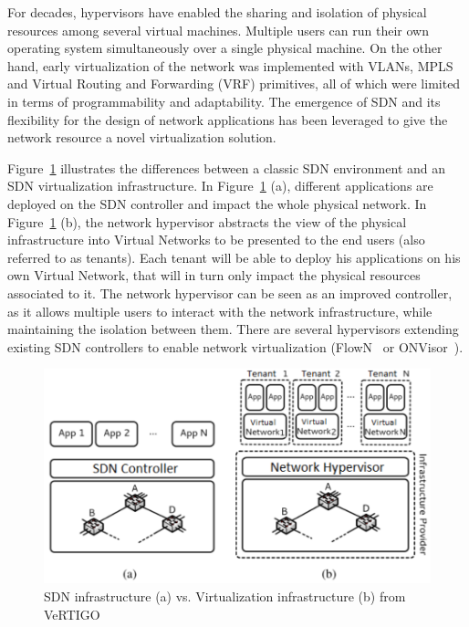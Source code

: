 For decades, hypervisors have enabled the sharing and isolation of physical resources among several virtual machines.
Multiple users can run their own operating system simultaneously over a single physical machine.
On the other hand, early virtualization of the network was implemented with VLANs, MPLS and Virtual Routing and Forwarding (VRF) primitives, all of which were limited in terms of programmability and adaptability. The emergence of SDN and its flexibility for the design of network applications has been leveraged to give the network resource a novel virtualization solution.

Figure~\ref{fig:virt-archi} illustrates the differences between a classic SDN environment and an SDN virtualization infrastructure. In Figure~\ref{fig:virt-archi} (a), different applications are deployed on the SDN controller and impact the whole physical network.
In Figure~\ref{fig:virt-archi} (b), the network hypervisor abstracts the view of the physical infrastructure into Virtual Networks to be presented to the end users (also referred to as tenants).
Each tenant will be able to deploy his applications on his own Virtual Network, that will in turn only impact the physical resources associated to it.
The network hypervisor can be seen as an improved controller, as it allows multiple users to interact with the network infrastructure, while maintaining the isolation between them.
There are several hypervisors extending existing SDN controllers to enable network virtualization (\eg FlowN~\cite{FlowN-Drutskoy2012} or ONVisor~\cite{ONVisor-Han2018}).

\begin{figure}[ht]
    \centering
    \includegraphics[scale=0.9]{figures/virt-archi.pdf}
    \caption{SDN infrastructure (a) vs. Virtualization infrastructure (b) from VeRTIGO~\cite{VeRTIGO-Corin2012a}}
    \label{fig:virt-archi}
\end{figure}


